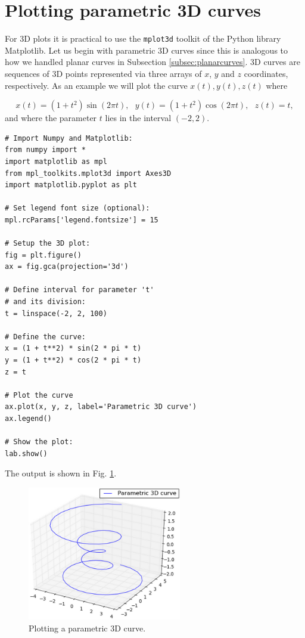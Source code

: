 \documentclass{article}
\begin{document}
\section{Plotting parametric 3D curves}

For 3D plots it is practical to use the {\tt mplot3d} toolkit of the 
Python library Matplotlib. Let us begin with 
parametric 3D curves since this is analogous to how we handled planar curves in 
Subsection \ref{subsec:planarcurves}. 3D curves are sequences of 3D points
represented via three arrays of $x$, $y$ and $z$ coordinates, respectively. As an 
example we will plot the curve $x(t), y(t), z(t)$ where

$$
x(t) = (1 + t^2) \sin(2 \pi t), \ \ \ y(t) = (1 + t^2) \cos(2 \pi t), \ \ \ z(t) = t,
$$
and where the parameter $t$ lies in the interval $(-2, 2)$.

\begin{verbatim}
# Import Numpy and Matplotlib:
from numpy import *
import matplotlib as mpl
from mpl_toolkits.mplot3d import Axes3D
import matplotlib.pyplot as plt

# Set legend font size (optional):
mpl.rcParams['legend.fontsize'] = 15

# Setup the 3D plot:
fig = plt.figure()
ax = fig.gca(projection='3d')

# Define interval for parameter 't'
# and its division:
t = linspace(-2, 2, 100)

# Define the curve:
x = (1 + t**2) * sin(2 * pi * t)
y = (1 + t**2) * cos(2 * pi * t)
z = t

# Plot the curve
ax.plot(x, y, z, label='Parametric 3D curve')
ax.legend()

# Show the plot:
lab.show()
\end{verbatim}
The output is shown in Fig. \ref{fig:plot3d-1}.

\begin{figure}[!ht]
\begin{center}
\includegraphics[width=0.6\textwidth]{img/plot3d-1.png}
\end{center}
\vspace{-4mm}
\caption{Plotting a parametric 3D curve.}
\label{fig:plot3d-1}
\end{figure}
\end{document}

